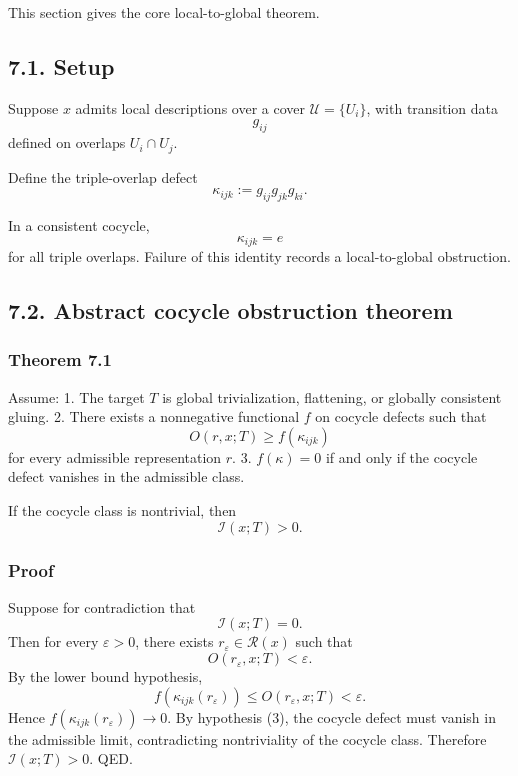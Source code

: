 \documentclass[
]{article}
\begin{document}
This section gives the core local-to-global theorem.

\subsection{7.1. Setup}\label{setup}

Suppose \(x\) admits local descriptions over a cover
\(\mathcal{U} = \{U_i\}\), with transition data \[
g_{ij}
\] defined on overlaps \(U_i \cap U_j\).

Define the triple-overlap defect \[
\kappa_{ijk} := g_{ij} g_{jk} g_{ki}.
\]

In a consistent cocycle, \[
\kappa_{ijk} = e
\] for all triple overlaps. Failure of this identity records a
local-to-global obstruction.

\subsection{7.2. Abstract cocycle obstruction
theorem}\label{abstract-cocycle-obstruction-theorem}

\subsubsection{Theorem 7.1}\label{theorem-7.1}

Assume: 1. The target \(T\) is global trivialization, flattening, or
globally consistent gluing. 2. There exists a nonnegative functional
\(f\) on cocycle defects such that \[
   O(r,x;T) \ge f(\kappa_{ijk})
   \] for every admissible representation \(r\). 3. \(f(\kappa)=0\) if
and only if the cocycle defect vanishes in the admissible class.

If the cocycle class is nontrivial, then \[
\mathcal{I}(x;T) > 0.
\]

\subsubsection{Proof}\label{proof-5}

Suppose for contradiction that \[
\mathcal{I}(x;T)=0.
\] Then for every \(\varepsilon > 0\), there exists
\(r_\varepsilon \in \mathcal{R}(x)\) such that \[
O(r_\varepsilon,x;T) < \varepsilon.
\] By the lower bound hypothesis, \[
f(\kappa_{ijk}(r_\varepsilon)) \le O(r_\varepsilon,x;T) < \varepsilon.
\] Hence \(f(\kappa_{ijk}(r_\varepsilon)) \to 0\). By hypothesis (3),
the cocycle defect must vanish in the admissible limit, contradicting
nontriviality of the cocycle class. Therefore \(\mathcal{I}(x;T) > 0\).
QED.
\end{document}
